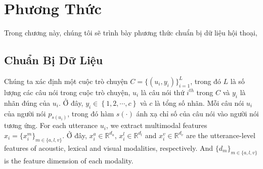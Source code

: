 \chapter{Phương Thức}
\label{chap:Phương Thức}

Trong chương này, chúng tôi sẽ trình bày phương thức chuẩn bị dữ liệu hội thoại, 

\section{Chuẩn Bị Dữ Liệu}

Chúng ta xác định một cuộc trò chuyện $C=\{ \left(u_{i}, y_{i}\right)\}_{i=1}^{L}$, trong đó $L$ là số lượng các câu nói trong cuộc trò chuyện, $u_{i}$ là câu nói thứ $i^{th}$ trong $C$ và $y_{i}$ là nhãn đúng của $u_{i}$. 
Ở đây, $y_{i} \in \left\{1,2,\cdots, c\right\}$ và $c$ là tổng số nhãn. 
Mỗi câu nói $u_{i}$ của người nói $p_{s(u_i)}$, trong đó hàm $s(\cdot)$ ánh xạ chỉ số của câu nói vào người nói tương ứng. For each utterance $u_{i}$, we extract multimodal features $x_{i}=\{{x}_{i}^m\}_{m\in\{a, l, v\}}$. 
Ở đây, $x_{i}^a \in \mathbb{R}^{d_a}$, $x_{i}^l \in \mathbb{R}^{d_l}$ and $x_{i}^v \in \mathbb{R}^{d_v}$ are the utterance-level features of acoustic, lexical and visual modalities, respectively. 
And $\{d_{m}\}_{m\in\{a, l, v\}}$ is the feature dimension of each modality.



